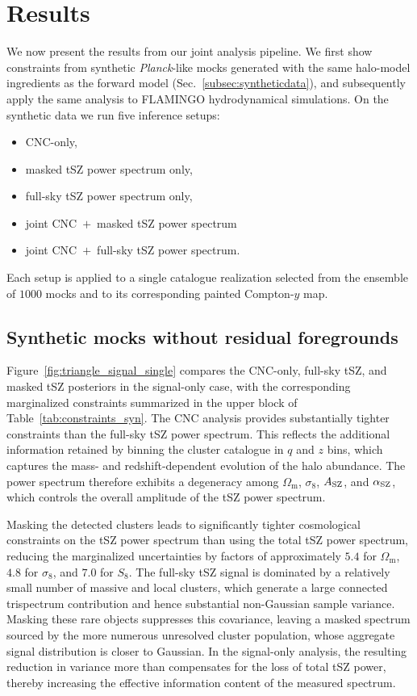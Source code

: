 \documentclass[aps,prd,twocolumn,superscriptaddress,nofootinbib,floatfix]{revtex4-2}
\begin{document}
\section{Results}
\label{sec:results}
We now present the results from our joint analysis pipeline.
We first show constraints from synthetic \textit{Planck}-like mocks generated with the same halo-model ingredients as the forward model (Sec.~\ref{subsec:syntheticdata}), and subsequently apply the same analysis to FLAMINGO hydrodynamical simulations. On the synthetic data we run five inference setups:
\begin{itemize}
    \item CNC-only,
    \item masked tSZ power spectrum only,
    \item full-sky tSZ power spectrum only,
    \item joint CNC~$+$~masked tSZ power spectrum 
    \item joint CNC~$+$~full-sky tSZ power spectrum.
\end{itemize}
Each setup is applied to a single catalogue realization selected from the ensemble of $1000$ mocks and to its corresponding painted Compton-$y$ map.

\subsection{Synthetic mocks without residual foregrounds}
\label{sec:results_syn_nofg}
Figure~\ref{fig:triangle_signal_single} compares the CNC-only, full-sky tSZ, and masked tSZ posteriors in the signal-only case, with the corresponding marginalized constraints summarized in the upper block of Table~\ref{tab:constraints_syn}. The CNC analysis provides substantially tighter constraints than the full-sky tSZ power spectrum. This reflects the additional information retained by binning the cluster catalogue in $q$ and $z$ bins, which captures the mass- and redshift-dependent evolution of the halo abundance. The power spectrum therefore exhibits a degeneracy among $\Omega_{\mathrm{m}}$, $\sigma_8$, $A_{\rm SZ}$, and $\alpha_{\rm SZ}$, which controls the overall amplitude of the tSZ power spectrum.

Masking the detected clusters leads to significantly tighter cosmological constraints on the tSZ power spectrum than using the total tSZ power spectrum, reducing the marginalized uncertainties by factors of approximately $5.4$ for $\Omega_{\mathrm{m}}$, $4.8$ for $\sigma_8$, and $7.0$ for $S_8$. The full-sky tSZ signal is dominated by a relatively small number of massive and local clusters, which generate a large connected trispectrum contribution and hence substantial non-Gaussian sample variance. Masking these rare objects suppresses this covariance, leaving a masked spectrum sourced by the more numerous unresolved cluster population, whose aggregate signal distribution is closer to Gaussian. In the signal-only analysis, the resulting reduction in variance more than compensates for the loss of total tSZ power, thereby increasing the effective information content of the measured spectrum.
\end{document}
